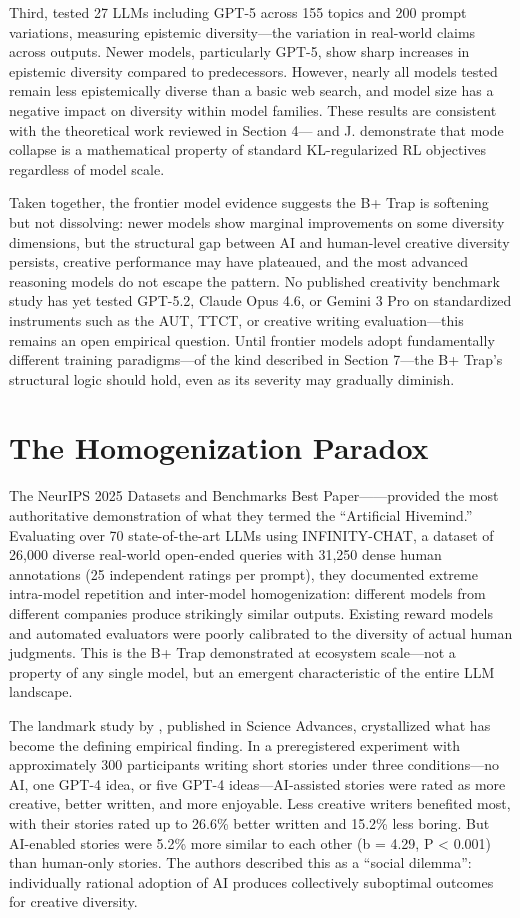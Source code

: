 \documentclass[12pt,a4paper]{article}
\begin{document}
Third, \citet{wright2025} tested 27 LLMs including GPT-5 across 155 topics and 200 prompt variations, measuring epistemic diversity---the variation in real-world claims across outputs. Newer models, particularly GPT-5, show sharp increases in epistemic diversity compared to predecessors. However, nearly all models tested remain less epistemically diverse than a basic web search, and model size has a negative impact on diversity within model families. These results are consistent with the theoretical work reviewed in Section 4---\citet{gxchen2025} and J. \citet{chen2025entropy} demonstrate that mode collapse is a mathematical property of standard KL-regularized RL objectives regardless of model scale.

Taken together, the frontier model evidence suggests the B+ Trap is softening but not dissolving: newer models show marginal improvements on some diversity dimensions, but the structural gap between AI and human-level creative diversity persists, creative performance may have plateaued, and the most advanced reasoning models do not escape the pattern. No published creativity benchmark study has yet tested GPT-5.2, Claude Opus 4.6, or Gemini 3 Pro on standardized instruments such as the AUT, TTCT, or creative writing evaluation---this remains an open empirical question. Until frontier models adopt fundamentally different training paradigms---of the kind described in Section 7---the B+ Trap's structural logic should hold, even as its severity may gradually diminish.

\section{The Homogenization Paradox}
The NeurIPS 2025 Datasets and Benchmarks Best Paper---\citet{jiang2025}---provided the most authoritative demonstration of what they termed the ``Artificial Hivemind.'' Evaluating over 70 state-of-the-art LLMs using INFINITY-CHAT, a dataset of 26,000 diverse real-world open-ended queries with 31,250 dense human annotations (25 independent ratings per prompt), they documented extreme intra-model repetition and inter-model homogenization: different models from different companies produce strikingly similar outputs. Existing reward models and automated evaluators were poorly calibrated to the diversity of actual human judgments. This is the B+ Trap demonstrated at ecosystem scale---not a property of any single model, but an emergent characteristic of the entire LLM landscape.

The landmark study by \citet{doshi2024}, published in Science Advances, crystallized what has become the defining empirical finding. In a preregistered experiment with approximately 300 participants writing short stories under three conditions---no AI, one GPT-4 idea, or five GPT-4 ideas---AI-assisted stories were rated as more creative, better written, and more enjoyable. Less creative writers benefited most, with their stories rated up to 26.6\% better written and 15.2\% less boring. But AI-enabled stories were 5.2\% more similar to each other (b = 4.29, P < 0.001) than human-only stories. The authors described this as a ``social dilemma'': individually rational adoption of AI produces collectively suboptimal outcomes for creative diversity.
\end{document}
